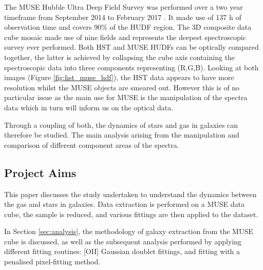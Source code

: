 \documentclass[12pt, twocolumn]{revtex4}    %
\begin{document}
The MUSE Hubble Ultra Deep Field Survey was performed over a two year timeframe from September 2014 to February 2017 \citep{bacon_muse_hudf}. It made use of 137 h of observation time and covers 90\% of the HUDF region. The 3D composite data cube mosaic made use of nine fields and represents the deepest spectroscopic survey ever performed. Both HST and MUSE HUDFs can be optically compared together, the latter is achieved by collapsing the cube axis containing the spectroscopic data into three components representing (R,G,B). Looking at both images (Figure \ref{fig:hst_muse_hdf}), the HST data appears to have more resolution whilst the MUSE objects are smeared out. However this is of no particular issue as the main use for MUSE is the manipulation of the spectra data which in turn will inform us on the optical data.




Through a coupling of both, the dynamics of stars and gas in galaxies can therefore be studied. The main analysis arising from the manipulation and comparison of different component areas of the spectra.

\subsection{Project Aims}
This paper discusses the study undertaken to understand the dynamics between the gas and stars in galaxies. Data extraction is performed on a MUSE data cube, the sample is reduced, and various fittings are then applied to the dataset.

In Section \ref{sec:analysis}, the methodology of galaxy extraction from the MUSE cube is discussed, as well as the subsequent analysis performed by applying different fitting routines: [OII] Gaussian doublet fittings, and fitting with a penalised pixel-fitting method. 


\end{document}
